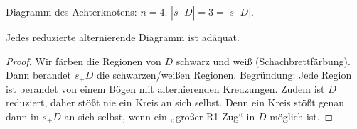 \begin{ex}
    Diagramm des Achterknotens: $n = 4$.
    $|s_+ D| = 3 = |s_- D|$.
\end{ex}

\begin{lem}
    Jedes reduzierte alternierende Diagramm ist adäquat.
    \begin{proof}
        Wir färben die Regionen von $D$ schwarz und weiß (Schachbrettfärbung).
        Dann berandet $s_\pm D$ die schwarzen/weißen Regionen.
        Begründung: Jede Region ist berandet von einem Bögen mit alternierenden Kreuzungen.
        Zudem ist $D$ reduziert, daher stößt nie ein Kreis an sich selbst.
        Denn ein Kreis stößt genau dann in $s_\pm D$ an sich selbst, wenn ein „großer R1-Zug“ in $D$ möglich ist.
    \end{proof}
\end{lem}

